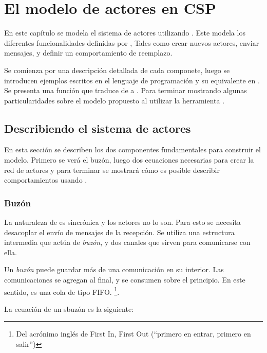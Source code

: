 \chapter{El modelo de actores en CSP}
En este capítulo se modela el sistema de actores utilizando \CSP. Este modela los diferentes funcionalidades definidas por \SAL, Tales como crear nuevos actores, enviar mensajes, y definir un comportamiento de reemplazo. 

Se comienza por una descripción detallada de cada componete, luego se introducen ejemplos escritos en el lenguaje de programación \SAL y su equivalente en \CSP. Se presenta una función que traduce de \SAL a \CSP. Para terminar mostrando algunas particularidades sobre el modelo propuesto al utilizar la herramienta \FDR.

\section{Describiendo el sistema de actores} 
En esta sección se describen los dos componentes fundamentales para construir el modelo. Primero se verá el buzón, luego dos ecuaciones necesarias para crear la red de actores y para terminar se mostrará cómo es posible describir comportamientos usando \CSP. 


\subsection{Buzón}\label{modelo:buzon}

La naturaleza de \CSP es sincrónica y los actores no lo son. Para esto se necesita desacoplar el envío de mensajes de la recepción. Se utiliza una estructura intermedia que actúa de \textit{buzón}, y dos canales que sirven para comunicarse con ella.

Un \textit{buzón} puede guardar más de una comunicación en su interior. Las comunicaciones se agregan al final, y se consumen sobre el principio. En este sentido, es una cola de tipo FIFO. \footnote{Del acrónimo inglés de First In, First Out (``primero en entrar, primero en salir'')}.

La ecuación de un  sbuzón es la siguiente:

